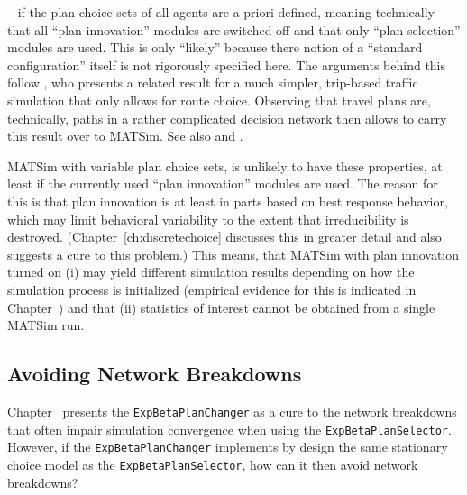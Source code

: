  -- if the plan choice sets of all agents are a priori
defined, meaning technically that all {}``plan innovation'' modules
are switched off and that only {}``plan selection'' modules are
used. This is only {}``likely'' because there notion of a {}``standard
configuration'' itself is not rigorously specified here. The arguments
behind this follow \citet{cascetta-1989}, who presents a related
result for a much simpler, trip-based traffic simulation that only
allows for route choice. Observing that travel plans are, technically,
paths in a rather complicated decision network then allows to carry
this result over to MATSim. See also \citet{nagel-1998} and \citep{floetteroed-2010e}.

MATSim with variable plan choice sets, is unlikely to have these properties,
at least if the currently used {}``plan innovation'' modules are
used. The reason for this is that plan innovation is at least in parts
based on best response behavior, which may limit behavioral variability
to the extent that irreducibility is destroyed. (Chapter~\ref{ch:discretechoice}
discusses this in greater detail and also suggests a cure to this
problem.) This means, that MATSim with plan innovation turned on (i)
may yield different simulation results depending on how the simulation
process is initialized (empirical evidence for this is indicated in
Chapter~)
and that (ii) statistics of interest cannot be obtained from a single
MATSim run.



\subsection{Avoiding Network Breakdowns}


Chapter~ presents the \texttt{ExpBetaPlanChanger}
as a cure to the network breakdowns that often impair simulation convergence
when using the \texttt{ExpBetaPlanSelector}. However, if the \texttt{ExpBetaPlanChanger}
implements by design the same stationary choice model as the \texttt{ExpBetaPlanSelector},
 how can it then avoid network breakdowns?

